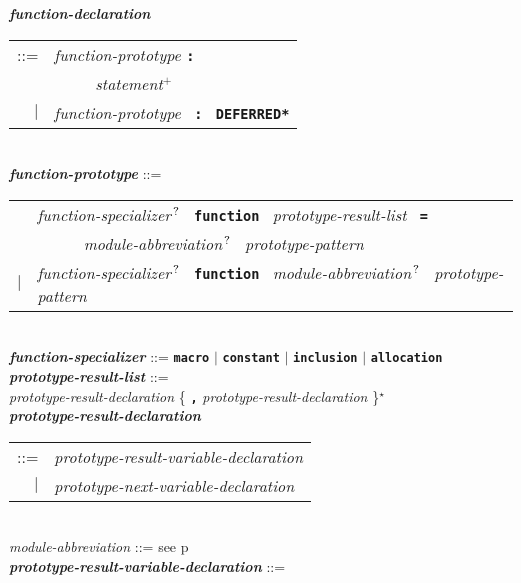 \documentclass[12pt]{article}
\newcommand{\TT}[1]{{\tt \bfseries #1}}
\newcommand{\STAR}{{\Large $^\star$}}
\newcommand{\PLUS}[1][]{{$^{+#1}$}}
\newcommand{\QMARK}{{$^{\,\mbox{\footnotesize ?}}$}}
\newcommand{\ttkey}[1]{{\tt \bfseries #1}}
\newcommand{\emkey}[1]{{\em \bfseries #1}}
\newcommand{\pagref}[1]{p\pageref{#1}}
\newenvironment{indpar}[1][0.3in]%
	{\begin{list}{}%
		     {\setlength{\itemsep}{0in}%
		      \setlength{\topsep}{0in}%
		      \setlength{\parsep}{1ex}%
		      \setlength{\labelwidth}{#1}%
		      \setlength{\leftmargin}{#1}%
		      \addtolength{\leftmargin}{\labelsep}}%
	 \item}%
	{\end{list}}
\begin{document}
\begin{indpar}[0.1in]
\emkey{function-declaration}\label{FUNCTION-DECLARATION}
    \begin{tabular}[t]{rl}
    ::= &  {\em function-prototype} \TT{:} \\
	& \TT{~~~~~}{\em statement}\PLUS{} \\
    $|$ &  {\em function-prototype}~ \TT{:}~ \ttkey{*DEFERRED*} \\
    \end{tabular}
\\[2ex]
\emkey{function-prototype}\label{FUNCTION-PROTOTYPE} ::= \\
\hspace*{0.25in}
    \begin{tabular}[t]{@{}rl}
        & {\em function-specializer}\QMARK{}~ \ttkey{function}~
          {\em prototype-result-list}~ \TT{=} \\
	& \TT{~~~~~} {\em module-abbreviation}\QMARK{}~
	             {\em prototype-pattern} \\
    $|$ & {\em function-specializer}\QMARK{}~ \ttkey{function}~
          {\em module-abbreviation}\QMARK{}~ {\em prototype-pattern} \\
    \end{tabular}
\\[2ex]
\emkey{function-specializer}\label{FUNCTION-SPECIALIZER} ::=
	\TT{macro} $|$ \TT{constant} $|$ \TT{inclusion} $|$ \TT{allocation}
\\[2ex]
\emkey{prototype-result-list}\label{PROTOTYPE-RESULT-LIST} ::= \\
\hspace*{0.5in}
    {\em prototype-result-declaration}
    \{ \TT{,} {\em prototype-result-declaration} \}\STAR{}
\\[0.5ex]
\emkey{prototype-result-declaration}\label{PROTOTYPE-RESULT-DECLARATION} \\
\hspace*{0.5in}\begin{tabular}[t]{rl}
    ::= & {\em prototype-result-variable-declaration} \\
    $|$ & {\em prototype-next-variable-declaration} \\
    \end{tabular}
\\[0.5ex]
{\em module-abbreviation} ::= see \pagref{MODULE-ABBREVIATION}
\\[0.5ex]
\emkey{prototype-result-variable-declaration}%
    \label{PROTOTYPE-RESULT-VARIABLE-DECLARATION} ::= \\

\end{indpar}
\end{document}
